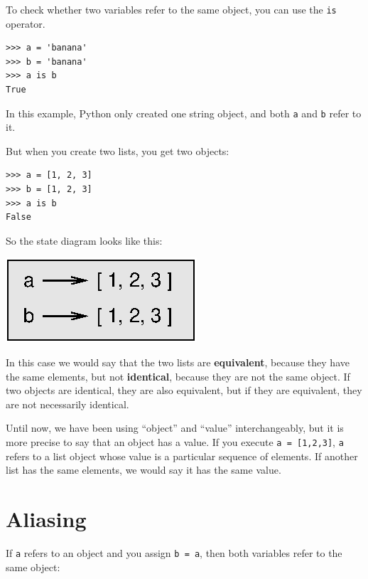 \documentclass[10pt]{book}
\begin{document}

To check whether two variables refer to the same object, you can
use the {\tt is} operator.

\beforeverb
\begin{verbatim}
>>> a = 'banana'
>>> b = 'banana'
>>> a is b
True
\end{verbatim}
\afterverb
%
In this example, Python only created one string object,
and both {\tt a} and {\tt b} refer to it.

But when you create two lists, you get two objects:

\beforeverb
\begin{verbatim}
>>> a = [1, 2, 3]
>>> b = [1, 2, 3]
>>> a is b
False
\end{verbatim}
\afterverb
%
So the state diagram looks like this:


\beforefig
\centerline{\includegraphics{figs/list2.eps}}
\afterfig

In this case we would say that the two lists are {\bf equivalent},
because they have the same elements, but not {\bf identical}, because
they are not the same object.  If two objects are identical, they are
also equivalent, but if they are equivalent, they are not necessarily
identical.


Until now, we have been using ``object'' and ``value''
interchangeably, but it is more precise to say that an object has a
value.  If you execute {\tt a = [1,2,3]}, {\tt a} refers to a list
object whose value is a particular sequence of elements.  If another
list has the same elements, we would say it has the same value.



\section{Aliasing}


If {\tt a} refers to an object and you assign {\tt b = a},
then both variables refer to the same object:
\end{document}
